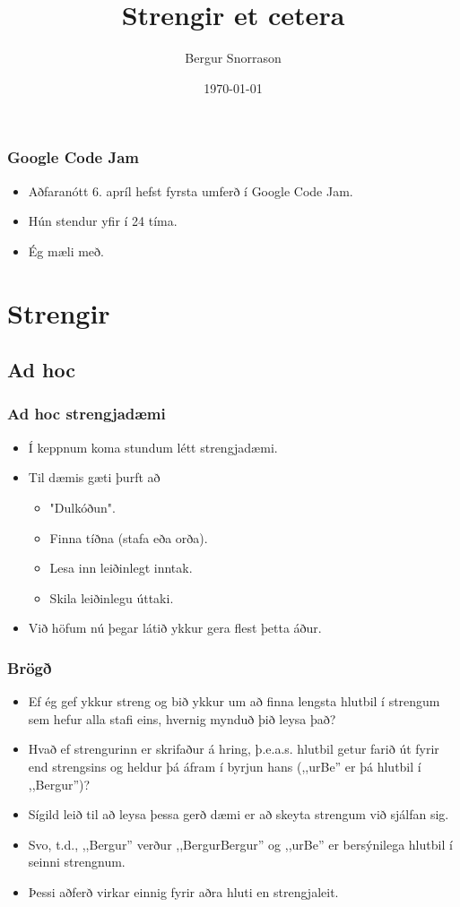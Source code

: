 \documentclass{beamer}
\title{Strengir et cetera}
\author{Bergur Snorrason}
\date{\today}
\begin{document}
\frame{\titlepage}

\begin{frame}
	\frametitle{Google Code Jam}
	\begin{itemize}
		\item<1-> Aðfaranótt 6. apríl hefst fyrsta umferð í Google Code Jam.
		\item<2-> Hún stendur yfir í 24 tíma.
		\item<3-> Ég mæli með.
	\end{itemize}
\end{frame}

\section[Strengir]{Strengir}
\subsection{Ad hoc}

\begin{frame}
	\frametitle{Ad hoc strengjadæmi}
	\begin{itemize}
		\item<1-> Í keppnum koma stundum létt strengjadæmi. 
		\item<2-> Til dæmis gæti þurft að
			\begin{itemize}
				\item<3-> "Dulkóðun".
				\item<4-> Finna tíðna (stafa eða orða).
				\item<5-> Lesa inn leiðinlegt inntak.
				\item<6-> Skila leiðinlegu úttaki.
			\end{itemize}
		\item<7-> Við höfum nú þegar látið ykkur gera flest þetta áður.
	\end{itemize}
\end{frame}

\begin{frame}
	\frametitle{Brögð}
	\begin{itemize}
		\item<1-> Ef ég gef ykkur streng og bið ykkur um að finna lengsta hlutbil í strengum sem hefur alla stafi eins,
			hvernig mynduð þið leysa það?
		\item<2-> Hvað ef strengurinn er skrifaður á hring, þ.e.a.s. hlutbil getur farið út fyrir end strengsins og heldur
			þá áfram í byrjun hans (,,urBe'' er þá hlutbil í ,,Bergur'')?
		\item<3-> Sígild leið til að leysa þessa gerð dæmi er að skeyta strengum við sjálfan sig.
		\item<4-> Svo, t.d., ,,Bergur'' verður ,,BergurBergur'' og ,,urBe'' er bersýnilega hlutbil í seinni strengnum.
		\item<5-> Þessi aðferð virkar einnig fyrir aðra hluti en strengjaleit.
	\end{itemize}
\end{frame}
\end{document}
